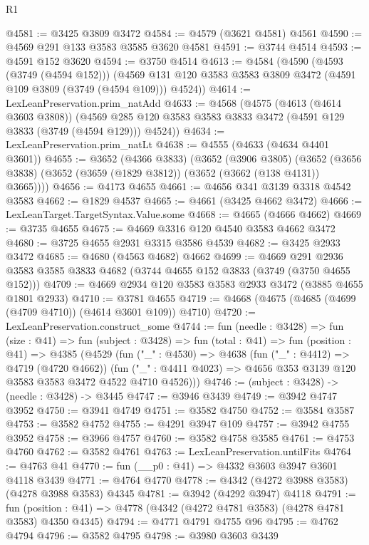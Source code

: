 \begin{lexlean}{R1}
\begin{coremodule}
@4581 := @3425 @3809 @3472
@4584 := @4579 (@3621 @4581) @4561
@4590 := @4569 @291 @133 @3583 @3585 @3620 @4581
@4591 := @3744 @4514
@4593 := @4591 @152 @3620
@4594 := @3750 @4514
@4613 := @4584
    (@4590
      (@4593 (@3749 (@4594 @152)))
      (@4569 @131 @120 @3583 @3583 @3809 @3472 (@4591 @109 @3809 (@3749 (@4594 @109))) @4524))
@4614 := LexLeanPreservation.prim_natAdd
@4633 := @4568
    (@4575
      (@4613 (@4614 @3603 @3808))
      (@4569 @285 @120 @3583 @3583 @3833 @3472 (@4591 @129 @3833 (@3749 (@4594 @129))) @4524))
@4634 := LexLeanPreservation.prim_natLt
@4638 := @4555 (@4633 (@4634 @4401 @3601))
@4655 := @3652
    (@4366 @3833)
    (@3652
      (@3906 @3805)
      (@3652 (@3656 @3838) (@3652 (@3659 (@1829 @3812)) (@3652 (@3662 (@138 @4131)) @3665))))
@4656 := @4173 @4655
@4661 := @4656 @341 @3139 @3318 @4542 @3583
@4662 := @1829 @4537
@4665 := @4661 (@3425 @4662 @3472)
@4666 := LexLeanTarget.TargetSyntax.Value.some
@4668 := @4665 (@4666 @4662)
@4669 := @3735 @4655
@4675 := @4669 @3316 @120 @4540 @3583 @4662 @3472
@4680 := @3725 @4655 @2931 @3315 @3586 @4539
@4682 := @3425 @2933 @3472
@4685 := @4680 (@4563 @4682) @4662
@4699 := @4669
    @291
    @2936
    @3583
    @3585
    @3833
    @4682
    (@3744 @4655 @152 @3833 (@3749 (@3750 @4655 @152)))
@4709 := @4669 @2934 @120 @3583 @3583 @2933 @3472 (@3885 @4655 @1801 @2933)
@4710 := @3781 @4655
@4719 := @4668 (@4675 (@4685 (@4699 (@4709 @4710)) (@4614 @3601 @109)) @4710)
@4720 := LexLeanPreservation.construct_some
@4744 := fun (needle : @3428) =>
  fun (size : @41) =>
  fun (subject : @3428) =>
  fun (total : @41) =>
  fun (position : @41) =>
  @4385
    (@4529
      (fun ("_" : @4530) =>
      @4638
        (fun ("_" : @4412) => @4719 (@4720 @4662))
        (fun ("_" : @4411 @4023) => @4656 @353 @3139 @120 @3583 @3583 @3472 @4522 @4710 @4526)))
@4746 := (subject : @3428) -> (needle : @3428) -> @3445
@4747 := @3946 @3439
@4749 := @3942 @4747 @3952
@4750 := @3941 @4749
@4751 := @3582 @4750
@4752 := @3584 @3587
@4753 := @3582 @4752
@4755 := @4291 @3947 @109
@4757 := @3942 @4755 @3952
@4758 := @3966 @4757
@4760 := @3582 @4758 @3585
@4761 := @4753 @4760
@4762 := @3582 @4761
@4763 := LexLeanPreservation.untilFits
@4764 := @4763 @41
@4770 := fun (__p0 : @41) => @4332 @3603 @3947 @3601 @4118 @3439
@4771 := @4764 @4770
@4778 := @4342 (@4272 @3988 @3583) (@4278 @3988 @3583) @4345
@4781 := @3942 (@4292 @3947) @4118
@4791 := fun (position : @41) => @4778 (@4342 (@4272 @4781 @3583) (@4278 @4781 @3583) @4350 @4345)
@4794 := @4771 @4791 @4755 @96
@4795 := @4762 @4794
@4796 := @3582 @4795
@4798 := @3980 @3603 @3439

\end{coremodule}
\end{lexlean}
